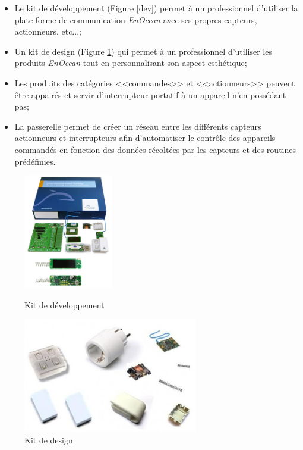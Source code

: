 \documentclass{rapportENS}
\begin{document}
\begin{itemize}
    \item Le kit de développement (Figure \ref{dev}) permet à un professionnel d'utiliser la plate-forme de communication \textit{EnOcean} avec ses propres capteurs, actionneurs, etc...;
    \item Un kit de design (Figure \ref{aestetics}) qui permet à un professionnel d'utiliser les produits \textit{EnOcean} tout en personnalisant son aspect esthétique;
    \item Les produits des catégories <<commandes>> et <<actionneurs>> peuvent être appairés et servir d'interrupteur portatif à un appareil n'en possédant pas;
    \item La passerelle permet de créer un réseau entre les différents capteurs actionneurs et interrupteurs afin d'automatiser le contrôle des appareils commandés en fonction des données récoltées par les capteurs et des routines prédéfinies.
\end{itemize}

\begin{figure}[h!]
     \centering
     \begin{minipage}[c]{0.5\linewidth}
     \centering
     \includegraphics[width=0.9\linewidth,height=5cm]{kitdev.png}
     \caption{Kit de développement}
     \label{dev}
     \end{minipage}\hfill
      \begin{minipage}[c]{0.5\linewidth}
      \centering
     \includegraphics[width=0.7\linewidth,height=5cm]{kitaestetics.png}
     \caption{Kit de design}
     \label{aestetics}
     \end{minipage}\hfill
 \end{figure}
\end{document}
